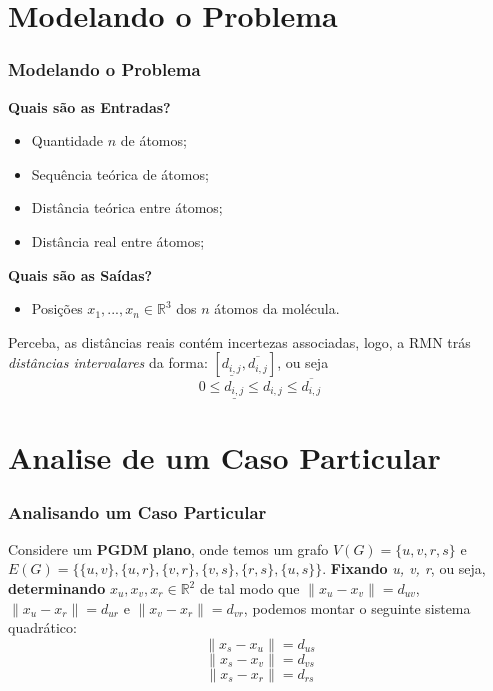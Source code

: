 \documentclass{beamer}
\begin{document}
\section{Modelando o Problema}
\begin{frame}
\frametitle{\normalsize Modelando o Problema}
\begin{multicols}{2}
	\textbf{Quais são as Entradas?}
	\begin{itemize}
    	\item Quantidade $n$ de átomos;
	   	\item Sequência teórica de átomos;
   		\item Distância teórica entre átomos;
   		\item Distância real entre átomos;
	\end{itemize}
 	\columnbreak
 	\textbf{Quais são as Saídas?}
 	\begin{itemize}
 		\item Posições $x_1, ..., x_n \in \mathbb{R}^3$ dos $n$ átomos da molécula.
 	\end{itemize}		    
\end{multicols}
Perceba, as distâncias reais contém incertezas associadas, logo, a RMN trás \textit{distâncias intervalares} da forma: $[\underline{d_{i,j}}, \overline{d_{i,j}}]$, ou seja
$$0\leq\underline{d_{i,j}}\leq d_{i,j} \leq \overline{d_{i,j}}$$
\end{frame}

\section{Analise de um Caso Particular}
\begin{frame}
\frametitle{\normalsize Analisando um Caso Particular}
\vspace{-1.5cm}
Considere um \textbf{PGDM} \textbf{plano}, onde temos um grafo $V(G)=\{u, v, r, s\}$ e $E(G)=\{\{u,v\}, \{u, r\}, \{v, r\}, \{v, s\}, \{r, s\}, \{u, s\}\}$. \textbf{Fixando} \textit{u, v, r}, ou seja, \textbf{determinando} $ x_{u}, x_{v},x_{r} \in\mathbb{R}^2$ de tal modo que $\|x_{u} - x_{v}\|= d_{uv}$,  $\|x_{u} - x_{r}\|= d_{ur}$ e $\|x_{v} - x_{r}\|= d_{vr}$, podemos montar o  seguinte sistema quadrático:\vspace{0.50cm}
$$ \|x_{s} - x_{u}\|= d_{us} $$$$ \|x_{s} - x_{v}\|= d_{vs} $$$$ \|x_{s} - x_{r}\|= d_{rs} $$
\end{frame}
\end{document}
